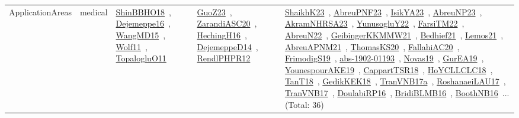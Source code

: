 {\begin{longtable}{lp{3cm}>{\raggedright\arraybackslash}p{6cm}>{\raggedright\arraybackslash}p{6cm}>{\raggedright\arraybackslash}p{8cm}}
ApplicationAreas & medical & \href{../works/ShinBBHO18.pdf}{ShinBBHO18}~\cite{ShinBBHO18}, \href{../works/Dejemeppe16.pdf}{Dejemeppe16}~\cite{Dejemeppe16}, \href{../works/WangMD15.pdf}{WangMD15}~\cite{WangMD15}, \href{../works/Wolf11.pdf}{Wolf11}~\cite{Wolf11}, \href{../works/TopalogluO11.pdf}{TopalogluO11}~\cite{TopalogluO11} & \href{../works/GuoZ23.pdf}{GuoZ23}~\cite{GuoZ23}, \href{../works/ZarandiASC20.pdf}{ZarandiASC20}~\cite{ZarandiASC20}, \href{../works/HechingH16.pdf}{HechingH16}~\cite{HechingH16}, \href{../works/DejemeppeD14.pdf}{DejemeppeD14}~\cite{DejemeppeD14}, \href{../works/RendlPHPR12.pdf}{RendlPHPR12}~\cite{RendlPHPR12} & \href{../works/ShaikhK23.pdf}{ShaikhK23}~\cite{ShaikhK23}, \href{../works/AbreuPNF23.pdf}{AbreuPNF23}~\cite{AbreuPNF23}, \href{../works/IsikYA23.pdf}{IsikYA23}~\cite{IsikYA23}, \href{../works/AbreuNP23.pdf}{AbreuNP23}~\cite{AbreuNP23}, \href{../works/AkramNHRSA23.pdf}{AkramNHRSA23}~\cite{AkramNHRSA23}, \href{../works/YunusogluY22.pdf}{YunusogluY22}~\cite{YunusogluY22}, \href{../works/FarsiTM22.pdf}{FarsiTM22}~\cite{FarsiTM22}, \href{../works/AbreuN22.pdf}{AbreuN22}~\cite{AbreuN22}, \href{../works/GeibingerKKMMW21.pdf}{GeibingerKKMMW21}~\cite{GeibingerKKMMW21}, \href{../works/Bedhief21.pdf}{Bedhief21}~\cite{Bedhief21}, \href{../works/Lemos21.pdf}{Lemos21}~\cite{Lemos21}, \href{../works/AbreuAPNM21.pdf}{AbreuAPNM21}~\cite{AbreuAPNM21}, \href{../works/ThomasKS20.pdf}{ThomasKS20}~\cite{ThomasKS20}, \href{../works/FallahiAC20.pdf}{FallahiAC20}~\cite{FallahiAC20}, \href{../works/FrimodigS19.pdf}{FrimodigS19}~\cite{FrimodigS19}, \href{../works/abs-1902-01193.pdf}{abs-1902-01193}~\cite{abs-1902-01193}, \href{../works/Novas19.pdf}{Novas19}~\cite{Novas19}, \href{../works/GurEA19.pdf}{GurEA19}~\cite{GurEA19}, \href{../works/YounespourAKE19.pdf}{YounespourAKE19}~\cite{YounespourAKE19}, \href{../works/CappartTSR18.pdf}{CappartTSR18}~\cite{CappartTSR18}, \href{../works/HoYCLLCLC18.pdf}{HoYCLLCLC18}~\cite{HoYCLLCLC18}, \href{../works/TanT18.pdf}{TanT18}~\cite{TanT18}, \href{../works/GedikKEK18.pdf}{GedikKEK18}~\cite{GedikKEK18}, \href{../works/TranVNB17a.pdf}{TranVNB17a}~\cite{TranVNB17a}, \href{../works/RoshanaeiLAU17.pdf}{RoshanaeiLAU17}~\cite{RoshanaeiLAU17}, \href{../works/TranVNB17.pdf}{TranVNB17}~\cite{TranVNB17}, \href{../works/DoulabiRP16.pdf}{DoulabiRP16}~\cite{DoulabiRP16}, \href{../works/BridiBLMB16.pdf}{BridiBLMB16}~\cite{BridiBLMB16}, \href{../works/BoothNB16.pdf}{BoothNB16}~\cite{BoothNB16}... (Total: 36)\\

\end{longtable}}
